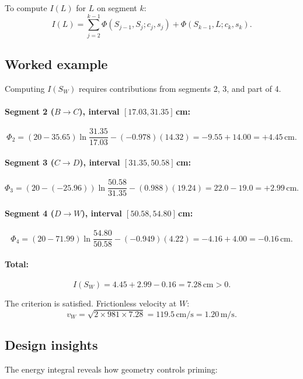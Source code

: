 \documentclass[11pt]{article}
\begin{document}
To compute $I(L)$ for $L$ on segment $k$:
\begin{equation}
  I(L) = \sum_{j=2}^{k-1} \Phi(S_{j-1}, S_j; c_j, s_j) + \Phi(S_{k-1}, L; c_k, s_k).
  \label{eq:I-piecewise}
\end{equation}

\subsection{Worked example}

Computing $I(S_W)$ requires contributions from segments 2, 3, and part of 4.

\paragraph{Segment 2 ($B \to C$), interval $[17.03, 31.35]$\,cm:}
\[
  \Phi_2 = (20 - 35.65)\ln\frac{31.35}{17.03} - (-0.978)(14.32) = -9.55 + 14.00 = +4.45\,\text{cm}.
\]

\paragraph{Segment 3 ($C \to D$), interval $[31.35, 50.58]$\,cm:}
\[
  \Phi_3 = (20 - (-25.96))\ln\frac{50.58}{31.35} - (0.988)(19.24) = 22.0 - 19.0 = +2.99\,\text{cm}.
\]

\paragraph{Segment 4 ($D \to W$), interval $[50.58, 54.80]$\,cm:}
\[
  \Phi_4 = (20 - 71.99)\ln\frac{54.80}{50.58} - (-0.949)(4.22) = -4.16 + 4.00 = -0.16\,\text{cm}.
\]

\paragraph{Total:}
\begin{equation}
  I(S_W) = 4.45 + 2.99 - 0.16 = 7.28\,\text{cm} > 0.
  \label{eq:I-SW-value}
\end{equation}

The criterion is satisfied. Frictionless velocity at $W$:
\[
  v_W = \sqrt{2 \times 981 \times 7.28} = 119.5\,\text{cm/s} = 1.20\,\text{m/s}.
\]

\subsection{Design insights}

The energy integral reveals how geometry controls priming:
\end{document}

